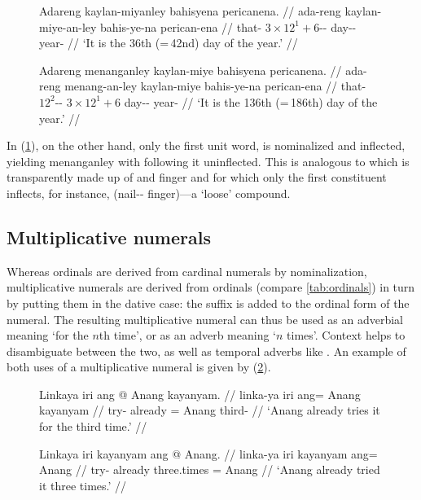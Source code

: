 \begin{figure}[h]
\pex
\a\label{ex:ordtightcomp}\begingl
	\gla Adareng kaylan-miyanley bahisyena pericanena. //
	\glb ada-reng kaylan-miye-an-ley bahis-ye-na perican-ena //
	\glc that-\AargI{} {$3 \times 12^1 + 6$-\Nmlz{}-\PargI{}} 
		day-\Pl{}-\Gen{} year-\Gen{} //
	\glft `It is the 36th (=\,42nd) day of the year.' //
\endgl

\a\label{ex:ordloosecomp}\begingl
	\gla Adareng menanganley kaylan-miye bahisyena pericanena. //
	\glb ada-reng menang-an-ley kaylan-miye bahis-ye-na perican-ena //
	\glc that-\AargI{} {$12^2$-\Nmlz{}-\PargI{}} {$3 \times 12^1 
		+ 6$} day-\Pl{}-\Gen{} year-\Gen{} //
	\glft `It is the 136th (=\,186th) day of the year.' //
\endgl
\xe
\end{figure}

In (\ref{ex:ordloosecomp}), on the other hand, only the first unit word,
 is nominalized and inflected, yielding 
{menanganley} with  following it uninflected.
This is analogous to  which is
transparently made up of  and 
{finger} and for which only the first constituent inflects, for instance,
 (nail-\Pl{}-\Gen{}
finger)---a `loose' compound.

\subsection{Multiplicative numerals}

Whereas ordinals are derived from cardinal numerals by nominalization,
multiplicative numerals are derived from ordinals (compare
\autoref{tab:ordinals}) in turn by putting them in the dative case: the suffix
 is added to the ordinal form of the numeral. The resulting
multiplicative numeral can thus be used as an adverbial meaning `for the $n$th
time', or as an adverb meaning `$n$ times'. Context helps to disambiguate
between the two, as well as temporal adverbs like . An
example of both uses of a multiplicative numeral is given by 
(\ref{ex:multnumwo}).

\begin{figure}[h]
\pex\label{ex:multnumwo}
\a\begingl
	\gla Linkaya iri ang @ Anang kayanyam. //
	\glb linka-ya iri ang= Anang kayanyam //
	\glc try-\TsgM{} already \Aarg{}= Anang third-\Dat{} //
	\glft `Anang already tries it for the third time.' //
\endgl

\a\begingl
	\gla Linkaya iri kayanyam ang @ Anang. //
	\glb linka-ya iri kayanyam ang= Anang //
	\glc try-\TsgM{} already three.times \Aarg{}= Anang //
	\glft `Anang already tried it three times.' //
\endgl
\xe
\end{figure}

